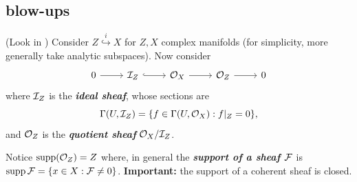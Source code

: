 \subsection{blow-ups}
(Look in \cite{hartshorne}) Consider $Z\overset{i}{\hookrightarrow}X$ for $Z,X$ complex manifolds (for simplicity, more generally take analytic subspaces). Now consider
\[\begin{tikzcd}
	0\arrow[r]&\If_Z\arrow[r,hook]&\Oc_X\arrow[r]&\Oc_Z\arrow[r]&0
\end{tikzcd}\]
where $\mathcal{I}_Z$ is the \textbf{\textit{ideal sheaf}}, whose sections are
\[\Gamma(U,\mathcal{I}_Z)=\{f\in\Gamma(U,\mathcal{O}_X):f|_Z=0\},\]
and $\mathcal{O}_Z$ is the \textbf{\textit{quotient sheaf}} $\mathcal{O}_X/\mathcal{I}_Z$.

Notice $\operatorname{supp}(\mathcal{O}_Z)=Z$ where, in general the \textbf{\textit{support of a sheaf $\mathcal{F}$}} is $\operatorname{supp}\mathcal{F}=\{x\in X:\mathcal{F}\neq0\}$. \textbf{Important:} the support of a coherent sheaf is closed.

